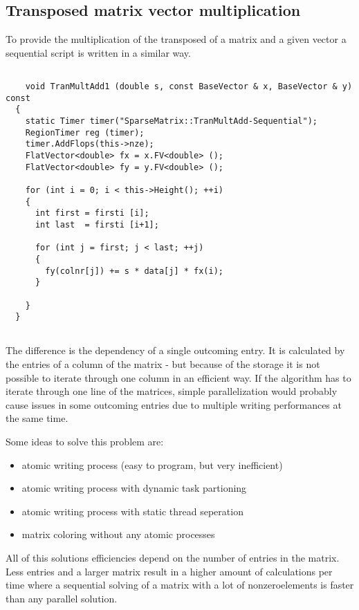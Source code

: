 \documentclass[a4paper,11pt]{scrartcl}
\begin{document}
\subsection{Transposed matrix vector multiplication}

To provide the multiplication of the transposed of a matrix and a given vector
 a sequential script is written in a similar way.

\begin{lstlisting}

	void TranMultAdd1 (double s, const BaseVector & x, BaseVector & y) const
  {
    static Timer timer("SparseMatrix::TranMultAdd-Sequential");
    RegionTimer reg (timer);
    timer.AddFlops(this->nze);
    FlatVector<double> fx = x.FV<double> ();
    FlatVector<double> fy = y.FV<double> ();

    for (int i = 0; i < this->Height(); ++i)
    {
      int first = firsti [i];
      int last  = firsti [i+1];

      for (int j = first; j < last; ++j)
      {
        fy(colnr[j]) += s * data[j] * fx(i);
      }

    }
  }


\end{lstlisting}

The difference is the dependency of a single outcoming entry. It is calculated
 by the entries of a column of the matrix - but because of the storage it is not
possible to iterate through one column in an efficient way. If the algorithm 
has to iterate through one line of the matrices, simple parallelization would
probably cause issues in some outcoming entries due to multiple writing
performances at the same time. 

Some ideas to solve this problem are:

\begin{itemize}

\item atomic writing process (easy to program, but very inefficient)
\item atomic writing process with dynamic task partioning
\item atomic writing process with static thread seperation
\item matrix coloring without any atomic processes

\end{itemize} 

All of this solutions efficiencies depend on the number of entries in the matrix.
Less entries and a larger matrix result in a higher amount of calculations per
 time where a sequential solving of a matrix with a lot of nonzeroelements is
 faster than any parallel solution.
\end{document}
